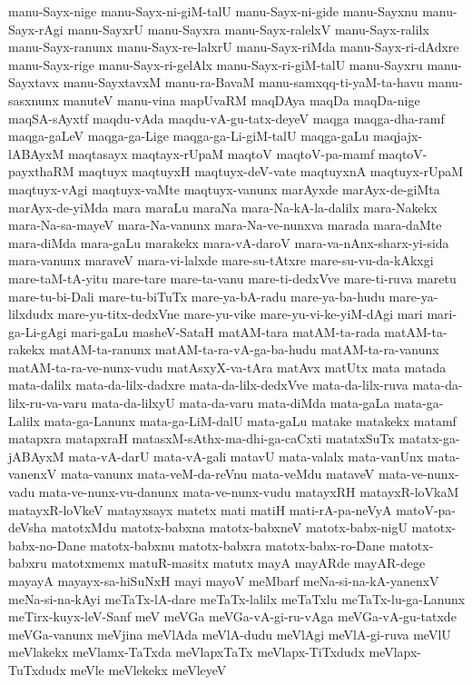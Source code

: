 {manu-Sayx-nige
manu-Sayx-ni-giM-talU
manu-Sayx-ni-gide
manu-Sayxnu
manu-Sayx-rAgi
manu-SayxrU
manu-Sayxra
manu-Sayx-ralelxV
manu-Sayx-ralilx
manu-Sayx-ranunx
manu-Sayx-re-lalxrU
manu-Sayx-riMda
manu-Sayx-ri-dAdxre
manu-Sayx-rige
manu-Sayx-ri-gelAlx
manu-Sayx-ri-giM-talU
manu-Sayxru
manu-Sayxtavx
manu-SayxtavxM
manu-ra-BavaM
manu-samxqq-ti-yaM-ta-havu
manu-sasxnunx
manuteV
manu-vina
mapUvaRM
maqDAya
maqDa
maqDa-nige
maqSA-sAyxtf
maqdu-vAda
maqdu-vA-gu-tatx-deyeV
maqga
maqga-dha-ramf
maqga-gaLeV
maqga-ga-Lige
maqga-ga-Li-giM-talU
maqga-gaLu
maqjajx-lABAyxM
maqtasayx
maqtayx-rUpaM
maqtoV
maqtoV-pa-mamf
maqtoV-payxthaRM
maqtuyx
maqtuyxH
maqtuyx-deV-vate
maqtuyxnA
maqtuyx-rUpaM
maqtuyx-vAgi
maqtuyx-vaMte
maqtuyx-vanunx
marAyxde
marAyx-de-giMta
marAyx-de-yiMda
mara
maraLu
maraNa
mara-Na-kA-la-dalilx
mara-Nakekx
mara-Na-sa-mayeV
mara-Na-vanunx
mara-Na-ve-nunxva
marada
mara-daMte
mara-diMda
mara-gaLu
marakekx
mara-vA-daroV
mara-va-nAnx-sharx-yi-sida
mara-vanunx
maraveV
mara-vi-lalxde
mare-su-tAtxre
mare-su-vu-da-kAkxgi
mare-taM-tA-yitu
mare-tare
mare-ta-vanu
mare-ti-dedxVve
mare-ti-ruva
maretu
mare-tu-bi-Dali
mare-tu-biTuTx
mare-ya-bA-radu
mare-ya-ba-hudu
mare-ya-lilxdudx
mare-yu-titx-dedxVne
mare-yu-vike
mare-yu-vi-ke-yiM-dAgi
mari
mari-ga-Li-gAgi
mari-gaLu
masheV-SataH
matAM-tara
matAM-ta-rada
matAM-ta-rakekx
matAM-ta-ranunx
matAM-ta-ra-vA-ga-ba-hudu
matAM-ta-ra-vanunx
matAM-ta-ra-ve-nunx-vudu
matAsxyX-va-tAra
matAvx
matUtx
mata
matada
mata-dalilx
mata-da-lilx-dadxre
mata-da-lilx-dedxVve
mata-da-lilx-ruva
mata-da-lilx-ru-va-varu
mata-da-lilxyU
mata-da-varu
mata-diMda
mata-gaLa
mata-ga-Lalilx
mata-ga-Lanunx
mata-ga-LiM-dalU
mata-gaLu
matake
matakekx
matamf
matapxra
matapxraH
matasxM-sAthx-ma-dhi-ga-caCxti
matatxSuTx
matatx-ga-jABAyxM
mata-vA-darU
mata-vA-gali
matavU
mata-valalx
mata-vanUnx
mata-vanenxV
mata-vanunx
mata-veM-da-reVnu
mata-veMdu
mataveV
mata-ve-nunx-vadu
mata-ve-nunx-vu-danunx
mata-ve-nunx-vudu
matayxRH
matayxR-loVkaM
matayxR-loVkeV
matayxsayx
matetx
mati
matiH
mati-rA-pa-neVyA
matoV-pa-deVsha
matotxMdu
matotx-babxna
matotx-babxneV
matotx-babx-nigU
matotx-babx-no-Dane
matotx-babxnu
matotx-babxra
matotx-babx-ro-Dane
matotx-babxru
matotxmemx
matuR-masitx
matutx
mayA
mayARde
mayAR-dege
mayayA
mayayx-sa-hiSuNxH
mayi
mayoV
meMbarf
meNa-si-na-kA-yanenxV
meNa-si-na-kAyi
meTaTx-lA-dare
meTaTx-lalilx
meTaTxlu
meTaTx-lu-ga-Lanunx
meTirx-kuyx-leV-Sanf
meV
meVGa
meVGa-vA-gi-ru-vAga
meVGa-vA-gu-tatxde
meVGa-vanunx
meVjina
meVlAda
meVlA-dudu
meVlAgi
meVlA-gi-ruva
meVlU
meVlakekx
meVlamx-TaTxda
meVlapxTaTx
meVlapx-TiTxdudx
meVlapx-TuTxdudx
meVle
meVlekekx
meVleyeV
}

